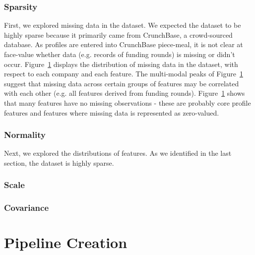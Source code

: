\documentclass[../thesis/thesis.tex]{subfiles}
\begin{document}

\subsubsection{Sparsity}

First, we explored missing data in the dataset. We expected the dataset to be highly sparse because it primarily came from CrunchBase, a crowd-sourced database. As profiles are entered into CrunchBase piece-meal, it is not clear at face-value whether data (e.g. records of funding rounds) is missing or didn't occur. Figure~\ref{} displays the distribution of missing data in the dataset, with respect to each company and each feature. The multi-modal peaks of Figure~\ref{} suggest that missing data across certain groups of features may be correlated with each other (e.g. all features derived from funding rounds). Figure~\ref{} shows that many features have no missing observations - these are probably core profile features and features where missing data is represented as zero-valued.


\subsubsection{Normality}

Next, we explored the distributions of features. As we identified in the last section, the dataset is highly sparse. %



\subsubsection{Scale}



\subsubsection{Covariance}



\section{Pipeline Creation}
\end{document}
